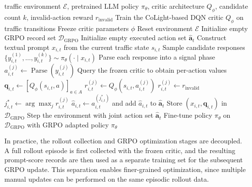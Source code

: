 \begin{algorithm}[h]
    \caption{End-to-end \textit{DGLight} training}
    \label{alg:dglight_training}
    \begin{algorithmic}[1]
        \Require traffic environment $\mathcal{E}$, pretrained LLM policy $\pi_\theta$, critic architecture $Q_\phi$, candidate count $k$, invalid-action reward $r_{\mathrm{invalid}}$
        \State Train the CoLight-based DQN critic $Q_\phi$ on traffic transitions
        \State Freeze critic parameters $\phi$
            \State Reset environment $\mathcal{E}$
            \State Initialize empty GRPO record set $\mathcal{D}_{\mathrm{GRPO}}$
                \State Initialize empty executed action set $\hat{\mathbf{a}}_t$
                    \State Construct textual prompt $x_{i,t}$ from the current traffic state $s_{i,t}$
                    \State Sample candidate responses $\{y_{i,t}^{(1)}, \dots, y_{i,t}^{(k)}\} \sim \pi_\theta(\cdot \mid x_{i,t})$
                    \State Parse each response into a signal phase $a_{i,t}^{(j)} \gets \operatorname{Parse}(y_{i,t}^{(j)})$
                    \State Query the frozen critic to obtain per-action values $\mathbf{q}_{i,t} \gets [Q_\phi(s_{i,t}, a)]_{a \in A}$
                            \State $r_{i,t}^{(j)} \gets Q_\phi(s_{i,t}, a_{i,t}^{(j)})$
                        \Else
                            \State $r_{i,t}^{(j)} \gets r_{\mathrm{invalid}}$
                        \EndIf
                    \EndFor
                    \State $j_{i,t}^{*} \gets \arg\max_j r_{i,t}^{(j)}$
                    \State $\hat{a}_{i,t} \gets a_{i,t}^{(j_{i,t}^{*})}$ and add $\hat{a}_{i,t}$ to $\hat{\mathbf{a}}_t$
                    \State Store $(x_{i,t}, \mathbf{q}_{i,t})$ in $\mathcal{D}_{\mathrm{GRPO}}$
                \EndFor
                \State Step the environment with joint action set $\hat{\mathbf{a}}_t$
            \EndWhile
            \State Fine-tune policy $\pi_\theta$ on $\mathcal{D}_{\mathrm{GRPO}}$ with GRPO
        \EndFor
        \State \Return adapted policy $\pi_\theta$
    \end{algorithmic}
\end{algorithm}

In practice, the rollout collection and GRPO optimization stages are decoupled. A full rollout episode is first collected with the frozen critic, and the resulting prompt-score records are then used as a separate training set for the subsequent GRPO update. This separation enables finer-grained optimization, since multiple manual updates can be performed on the same episodic rollout data.

